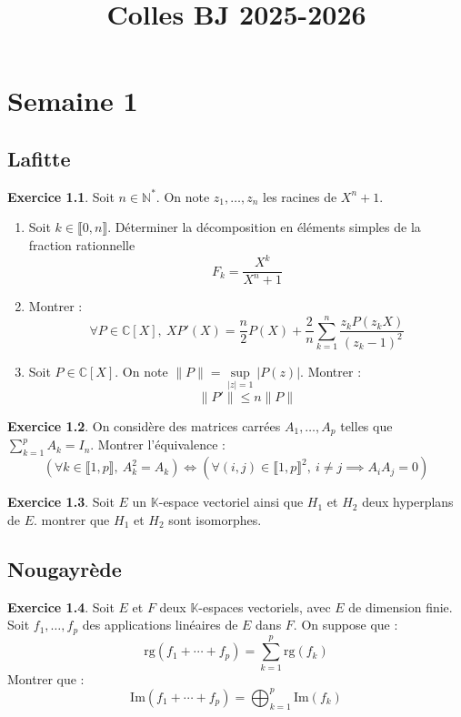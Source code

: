 \documentclass[french]{book}
\title{Colles BJ 2025-2026}
\newcommand{\N}{\mathbb{N}}
\newcommand{\C}{\mathbb{C}}
\newcommand{\K}{\mathbb{K}}
\newcommand{\st}{^*}
\theoremstyle{definition}
\newtheorem{ex}{Exercice}[chapter]
\begin{document}
\chapter{Semaine 1}

\section{Lafitte}

\begin{ex}
	Soit $n\in\N\st$. On note $z_1,\ldots,z_n$ les racines de $X^n+1$.
	\begin{enumerate}
		\item Soit $k\in\llbracket0,n\rrbracket$. Déterminer la décomposition en éléments simples de la fraction rationnelle $$F_k=\frac{X^k}{X^n+1}$$
		\item Montrer : $$\forall P\in\C[X],\ XP'(X)=\frac{n}{2}P(X)+\frac{2}{n}\sum_{k=1}^{n}\frac{z_kP(z_kX)}{(z_k-1)^2}$$
		\item Soit $P\in\C[X]$. On note $\lVert P\rVert=\underset{\lvert z\rvert=1}{\sup}\lvert P(z)\rvert$. Montrer : $$\lVert P'\rVert\leqslant n\lVert P\rVert$$
	\end{enumerate}
\end{ex}

\begin{ex}
	On considère des matrices carrées $A_1,\ldots,A_p$ telles que $\displaystyle\sum_{k=1}^{p}A_k=I_n$. Montrer l'équivalence : $$\left(\forall k\in\llbracket1,p\rrbracket,\ A_k^2=A_k\right)\iff \left(\forall (i,j)\in\llbracket1,p\rrbracket^2,\ i\ne j\implies A_iA_j=0\right)$$
\end{ex}

\begin{ex}
	Soit $E$ un $\K$-espace vectoriel ainsi que $H_1$ et $H_2$ deux hyperplans de $E$. montrer que $H_1$ et $H_2$ sont isomorphes.
\end{ex}

\section{Nougayrède}

\begin{ex}
	Soit $E$ et $F$ deux $\K$-espaces vectoriels, avec $E$ de dimension finie. Soit $f_1,\ldots,f_p$ des applications linéaires de $E$ dans $F$. On suppose que : $$\text{rg}(f_1+\cdots+f_p)=\sum_{k=1}^{p}\text{rg}(f_k)$$ Montrer que : $$\text{Im}(f_1+\cdots+f_p)=\bigoplus_{k=1}^p\text{Im}(f_k)$$
\end{ex}
\end{document}
